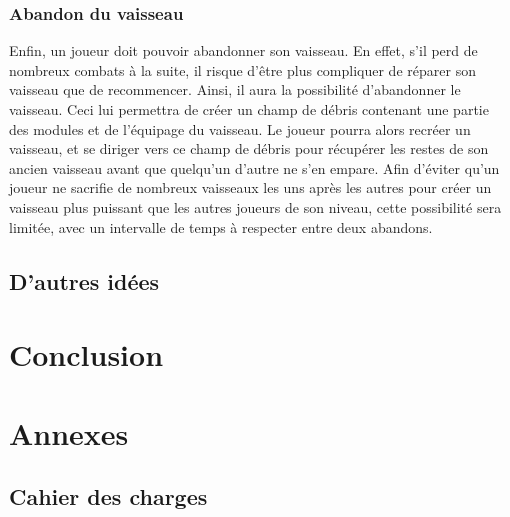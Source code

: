 \documentclass[a4paper,11pt]{report}
\begin{document}
    \subsection{Abandon du vaisseau}
      Enfin, un joueur doit pouvoir abandonner son vaisseau. 
      En effet, s'il perd de nombreux combats à la suite, il risque d'être plus compliquer de réparer son vaisseau que de recommencer.
      Ainsi, il aura la possibilité d'abandonner le vaisseau. Ceci lui permettra de créer un champ de débris contenant une partie des modules et de l'équipage du vaisseau.
      Le joueur pourra alors recréer un vaisseau, et se diriger vers ce champ de débris pour récupérer les restes de son ancien vaisseau avant que quelqu'un d'autre ne s'en empare.
      Afin d'éviter qu'un joueur ne sacrifie de nombreux vaisseaux les uns après les autres pour créer un vaisseau plus puissant que les autres joueurs de son niveau, cette possibilité sera limitée, avec un intervalle de temps à respecter entre deux abandons.
      
  \section{D'autres idées}

\chapter{Conclusion}

\chapter{Annexes}

  \section{Cahier des charges}
    
\end{document}
